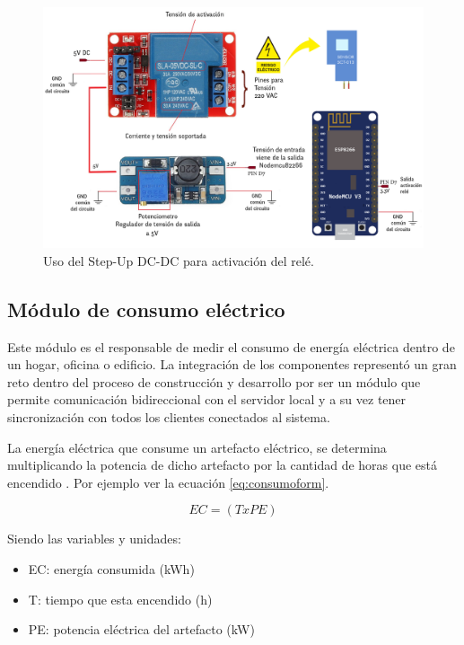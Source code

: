 \begin{figure}[htpb]
\centering 
\includegraphics[width=1.057\textwidth]{./Figures/esquemaactuador.png}
\caption{Uso del Step-Up DC-DC para activación del relé. }
\label{fig:esquemaactuador}
\end{figure}


\subsection{Módulo de consumo eléctrico}

Este módulo es el responsable de medir el consumo de energía eléctrica dentro de un hogar, oficina o edificio. La integración de los componentes representó un gran reto dentro del proceso de construcción y desarrollo por ser un módulo que permite comunicación bidireccional con el servidor local y a su vez tener sincronización con todos los clientes conectados al sistema.



La energía eléctrica que consume un artefacto eléctrico, se determina multiplicando la potencia de dicho artefacto por la cantidad de horas que está encendido \citep{BOOK:3}. Por ejemplo ver la ecuación \ref{eq:consumoform}.

\begin{equation}
	\label{eq:consumoform}
	EC = \left( T x PE \right)
\end{equation}

\vspace{0.2cm}
Siendo las variables y unidades:
\begin{itemize}
\item EC: energía consumida (kWh)
\item T: tiempo que esta encendido (h)
\item PE: potencia eléctrica del artefacto (kW)
\end{itemize}

